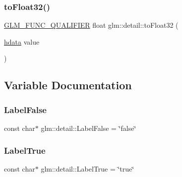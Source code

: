 \mbox{\label{namespaceglm_1_1detail_a8e4719d94d99ee1e625496e04317272b}} 
\subsubsection{\texorpdfstring{to\+Float32()}{toFloat32()}}
{\footnotesize\ttfamily \mbox{\hyperlink{setup_8hpp_a33fdea6f91c5f834105f7415e2a64407}{G\+L\+M\+\_\+\+F\+U\+N\+C\+\_\+\+Q\+U\+A\+L\+I\+F\+I\+ER}} float glm\+::detail\+::to\+Float32 (\begin{DoxyParamCaption}\item[{\mbox{\hyperlink{namespaceglm_1_1detail_aa2115f7dd38e14fea7ba9e95104120f3}{hdata}}}]{value }\end{DoxyParamCaption})}



\subsection{Variable Documentation}
\mbox{\label{namespaceglm_1_1detail_a9af06cfdb4ef874dc5c30348835bc549}} 
\subsubsection{\texorpdfstring{Label\+False}{LabelFalse}}
{\footnotesize\ttfamily const char$\ast$ glm\+::detail\+::\+Label\+False = \char`\"{}false\char`\"{}\hspace{0.3cm}{\ttfamily [static]}}

\mbox{\label{namespaceglm_1_1detail_acbf3b3879c4dca6a03fa14892e0beb85}} 
\subsubsection{\texorpdfstring{Label\+True}{LabelTrue}}
{\footnotesize\ttfamily const char$\ast$ glm\+::detail\+::\+Label\+True = \char`\"{}true\char`\"{}\hspace{0.3cm}{\ttfamily [static]}}

